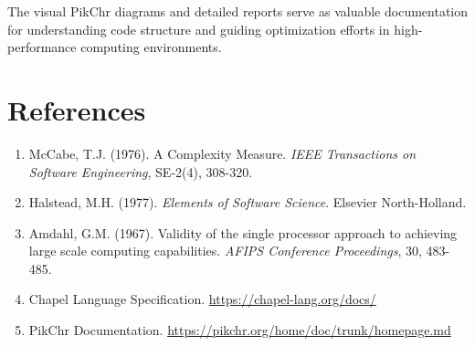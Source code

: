\documentclass[11pt,a4paper]{article}
\begin{document}
The visual PikChr diagrams and detailed reports serve as valuable documentation for understanding code structure and guiding optimization efforts in high-performance computing environments.

\section{References}

\begin{enumerate}
    \item McCabe, T.J. (1976). A Complexity Measure. \emph{IEEE Transactions on Software Engineering}, SE-2(4), 308-320.
    \item Halstead, M.H. (1977). \emph{Elements of Software Science}. Elsevier North-Holland.
    \item Amdahl, G.M. (1967). Validity of the single processor approach to achieving large scale computing capabilities. \emph{AFIPS Conference Proceedings}, 30, 483-485.
    \item Chapel Language Specification. \url{https://chapel-lang.org/docs/}
    \item PikChr Documentation. \url{https://pikchr.org/home/doc/trunk/homepage.md}
\end{enumerate}
\end{document}
